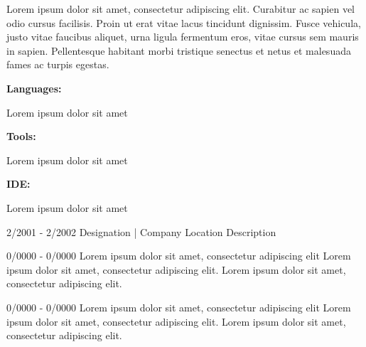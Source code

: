 \documentclass[a4paper,9pt]{developercv} %
\begin{document}
\begin{minipage}[t]{0.46\textwidth}
	\vspace{-6pt}
 
    
Lorem ipsum dolor sit amet, consectetur adipiscing elit. Curabitur ac sapien vel odio cursus facilisis. Proin ut erat vitae lacus tincidunt dignissim. Fusce vehicula, justo vitae faucibus aliquet, urna ligula fermentum eros, vitae cursus sem mauris in sapien. Pellentesque habitant morbi tristique senectus et netus et malesuada fames ac turpis egestas.
\end{minipage}
\hfill %
\begin{minipage}[t]{0.465\textwidth}
    \vspace{-6pt}
    
    \begin{minipage}[t]{0.2\textwidth}
        \textbf{Languages:}
    \end{minipage}
    \hfill
    \begin{minipage}[t]{0.73\textwidth}
      Lorem ipsum dolor sit amet 
    \end{minipage}
    \vspace{4mm}
    
    \begin{minipage}[t]{0.2\textwidth}
        \textbf{Tools:}
    \end{minipage}
    \hfill
    \begin{minipage}[t]{0.73\textwidth}
     Lorem ipsum dolor sit amet
    \end{minipage}

    \vspace{4mm}
    
    \begin{minipage}[t]{0.2\textwidth}
        \textbf{IDE:}
    \end{minipage}
    \hfill
    \begin{minipage}[t]{0.73\textwidth}
     Lorem ipsum dolor sit amet
    \end{minipage}
    
\end{minipage}


\begin{entrylist}
\entry
		{2/2001 - 2/2002}
		{Designation | Company}
		{Location }
		{Description}

    \entry
		{0/0000 - 0/0000}
		{Lorem ipsum dolor sit amet, consectetur adipiscing elit }
		{Lorem ipsum dolor sit amet, consectetur adipiscing elit. }
		{Lorem ipsum dolor sit amet, consectetur adipiscing elit.  }

          \entry
		{0/0000 - 0/0000}
		{Lorem ipsum dolor sit amet, consectetur adipiscing elit }
		{Lorem ipsum dolor sit amet, consectetur adipiscing elit. }
		{Lorem ipsum dolor sit amet, consectetur adipiscing elit.  }
        
\end{entrylist}
\end{document}
